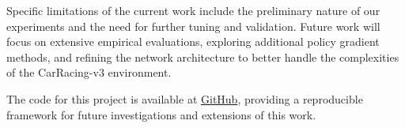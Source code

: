 \documentclass[../CSC_52081_EP.tex]{subfiles}
\begin{document}
Specific limitations of the current work include the preliminary nature of our experiments and the need for further tuning and validation. Future work will focus on extensive empirical evaluations, exploring additional policy gradient methods, and refining the network architecture to better handle the complexities of the CarRacing-v3 environment.

The code for this project is available at \href{https://github.com/tr0fin0/ensta_CSC_52081_EP_project}{GitHub}, providing a reproducible framework for future investigations and extensions of this work.
\end{document}

